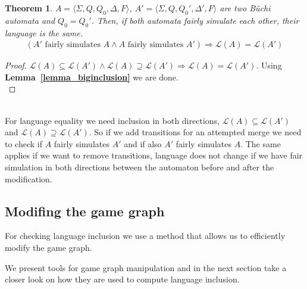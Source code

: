 \documentclass[12pt,oneside,bibliography=totoc,abstracton]{scrartcl}
\newcommand{\lemmaref}[1]{\textbf{Lemma~\ref{#1}}}
\newtheorem{mytheorem}{Theorem}
\begin{document}
\begin{mytheorem}\label{theorem_languageequivalence}
	$A = \langle\Sigma, Q , Q_0, \Delta, F\rangle$, $A' = \langle\Sigma, Q, Q_0', \Delta', F\rangle$
	are two Büchi automata and $Q_0 = Q_0'$. Then, if both automata \textnormal{fairly simulate}
	each other, their language is the same.
	\begin{align*}
		(A' \text{ fairly simulates } A \land A \text{ fairly simulates } A') \Rightarrow \mathcal{L}(A) = \mathcal{L}(A')
	\end{align*}
\end{mytheorem}
\begin{proof}
	$\mathcal{L}(A) \subseteq \mathcal{L}(A') \land \mathcal{L}(A) \supseteq \mathcal{L}(A') \Rightarrow \mathcal{L}(A) = \mathcal{L}(A')$.
	Using \lemmaref{lemma_biginclusion} we are done.\\
\end{proof}\quad\\
For language equality we need inclusion in both directions, $\mathcal{L}(A) \subseteq \mathcal{L}(A')$
and $\mathcal{L}(A) \supseteq \mathcal{L}(A')$. So if we add transitions for an attempted merge
we need to check if $A$ fairly simulates $A'$ and if also $A'$ fairly simulates $A$. The same applies if we want to
remove transitions, language does not change if we have fair simulation in both directions between
the automaton before and after the modification.

\subsection{Modifing the game graph}
For checking language inclusion we use a method that allows us to efficiently modify the
game graph.

We present tools for game graph manipulation and in the next section take a
closer look on how they are used to compute language inclusion.
\end{document}
